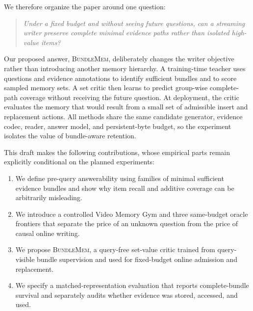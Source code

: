 \documentclass[10pt,twocolumn,letterpaper]{article}
\newcommand{\method}{\textnormal{\textsc{BundleMem}}\xspace}
\begin{document}
We therefore organize the paper around one question:

\begin{quote}
\emph{Under a fixed budget and without seeing future questions, can a streaming writer preserve complete minimal evidence paths rather than isolated high-value items?}
\end{quote}

Our proposed answer, \method, deliberately changes the writer objective rather than introducing another memory hierarchy.
A training-time teacher uses questions and evidence annotations to identify sufficient bundles and to score sampled memory sets.
A set critic then learns to predict group-wise complete-path coverage without receiving the future question.
At deployment, the critic evaluates the memory that would result from a small set of admissible insert and replacement actions.
All methods share the same candidate generator, evidence codec, reader, answer model, and persistent-byte budget, so the experiment isolates the value of bundle-aware retention.

This draft makes the following contributions, whose empirical parts remain explicitly conditional on the planned experiments:

\begin{enumerate}[leftmargin=*,itemsep=2pt]
    \item We define pre-query answerability using families of minimal sufficient evidence bundles and show why item recall and additive coverage can be arbitrarily misleading.
    \item We introduce a controlled Video Memory Gym and three same-budget oracle frontiers that separate the price of an unknown question from the price of causal online writing.
    \item We propose \method, a query-free set-value critic trained from query-visible bundle supervision and used for fixed-budget online admission and replacement.
    \item We specify a matched-representation evaluation that reports complete-bundle survival and separately audits whether evidence was stored, accessed, and used.
\end{enumerate}
\end{document}
